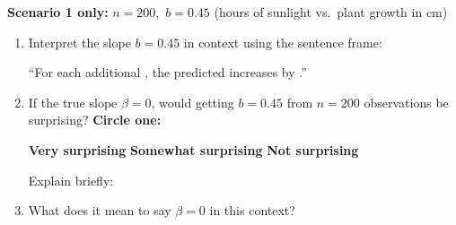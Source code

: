 \documentclass[10pt]{article}
\begin{document}
\begin{tcolorbox}[colback=white, colframe=black!40,
    title=\textbf{Tier R --- Remediate},
    fonttitle=\bfseries, arc=2mm, left=3mm, right=3mm, top=2mm, bottom=2mm]

\textbf{Scenario 1 only:} $n = 200$,\ $b = 0.45$ (hours of sunlight vs.\ plant growth in cm)

\begin{enumerate}[label=\alph*.]

  \item Interpret the slope $b = 0.45$ in context using the sentence frame:

        \vspace{0.05in}
        ``For each additional \blank{4.5cm}, the predicted \blank{4cm} increases by \blank{2cm}.''

        \vspace{0.1in}

  \item If the true slope $\beta = 0$, would getting $b = 0.45$ from $n = 200$
        observations be surprising? \textbf{Circle one:}

        \vspace{0.05in}
        \hspace{1cm}\textbf{Very surprising} \qquad \textbf{Somewhat surprising} \qquad \textbf{Not surprising}

        \vspace{0.05in}
        Explain briefly: 

  \item What does it mean to say $\beta = 0$ in this context?


\end{enumerate}
\end{tcolorbox}
\end{document}
